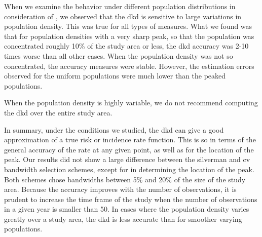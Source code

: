 When we examine the behavior under different population distributions in consideration of ,
we observed that the \gls{dkd} is sensitive to large variations in population density.
This was true for all types of measures.
What we found was that for population densities with a very sharp peak,
so that the population was concentrated roughly 10\% of the study area or less,
the \gls{dkd} accuracy was 2-10 times worse than all other cases.
When the population density was not so concentrated,
the accuracy measures were stable.
However,
the estimation errors observed for the uniform populations were much lower than the peaked populations.
\begin{rec}
    \label{rec:pop-density}
    When the population density is highly variable,
    we do not recommend computing the \gls{dkd} over the entire study area.
\end{rec}

In summary,
under the conditions we studied,
the \gls{dkd} can give a good approximation of a true \gls{risk} or \gls{incidence rate} function.
This is so in terms of the general accuracy of the rate at any given point,
as well as for the location of the peak.
Our results did not show a large difference between the \gls{silverman} and \gls{cv} bandwidth selection schemes,
except for in determining the location of the peak.
Both schemes chose bandwidths between 5\% and 20\% of the size of the study area.
Because the accuracy improves with the number of observations,
it is prudent to increase the time frame of the study when the number of observations in a given year is smaller than 50.
In cases where the population density varies greatly over a study area,
the \gls{dkd} is less accurate than for smoother varying populations.

